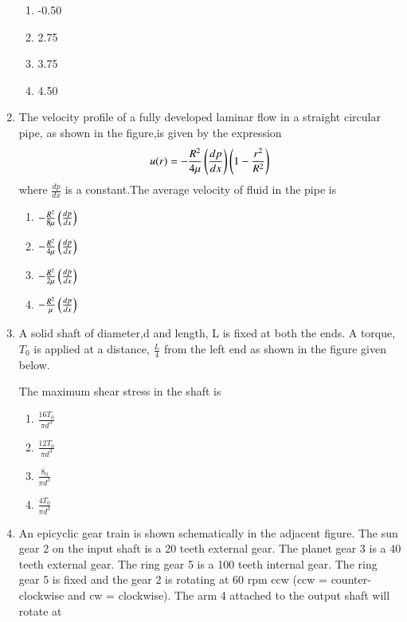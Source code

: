 \documentclass[journal]{IEEEtran}
\begin{document}
\begin{enumerate}
\begin{figure}[!ht]
    \label{fig:composite wall}
    \end{figure}
\begin{enumerate}
    \item  -0.50
    \item  2.75
    \item  3.75
    \item  4.50
  \end{enumerate} 
\item The velocity profile of a fully developed laminar flow in a straight circular pipe, as shown in the figure,is given by the expression
$$ u(r) = -\frac{R^2}{4 \mu} \left(\frac{dp}{dx}\right)\left(1 - \frac{r^2}{R^2}\right)$$ where $\frac{dp}{dx}$ is a constant.The average velocity of fluid in the pipe is
\begin{figure}[!ht]
    \centering
    \label{fig:velocity profile}
    \end{figure}
\begin{enumerate}
    \item  $-\frac{R^2}{8 \mu} \left(\frac{dp}{dx}\right)$
    \item  $-\frac{R^2}{4 \mu} \left(\frac{dp}{dx}\right)$
    \item  $-\frac{R^2}{2 \mu} \left(\frac{dp}{dx}\right)$
    \item  $-\frac{R^2}{ \mu} \left(\frac{dp}{dx}\right)$
  \end{enumerate}
\item A solid shaft of diameter,d and length, L is fixed at both the ends. A torque, $T_0$ is applied at a distance, $\frac{L}{4}$ from the left end as shown in the figure given below.
\begin{figure}[!ht]
    \centering
    \label{fig:shaft}
    \end{figure}
The maximum shear stress in the shaft is 
\begin{enumerate}
    \item  $\frac{16T_0}{\pi d^3}$
    \item  $\frac{12T_0}{\pi d^3}$
    \item  $\frac{8_0}{\pi d^3}$
    \item  $\frac{4T_0}{\pi d^3}$
  \end{enumerate}
\item An epicyclic gear train is shown schematically in the adjacent figure. The sun gear 2 on the input shaft is a 20 teeth external gear. The planet gear 3 is a 40 teeth external gear. The ring gear 5 is a 100 teeth internal gear. The ring gear 5 is fixed and the gear 2 is rotating at 60 rpm ccw (ccw = counter-clockwise and cw = clockwise). The arm 4 attached to the output shaft will rotate at 

\end{enumerate}
\end{document}
